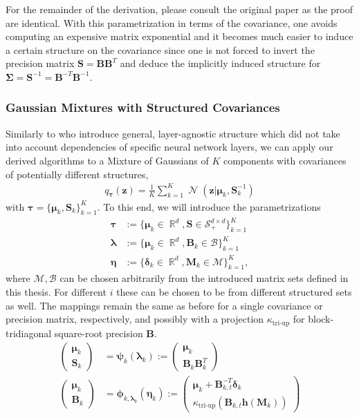 \documentclass[a4paper, 11pt, oneside]{scrartcl}
\theoremstyle{break}
\DeclareMathOperator{\Normal}{\mathcal{N}}
\DeclareMathOperator{\Real}{\mathbb{R}}
\newcommand{\matr}[1]{\boldsymbol{#1}}
\newcommand{\set}[1]{\mathcal{#1}}
\numberwithin{equation}{section}
\begin{document}
				For the remainder of the derivation, please consult the original paper \parencite{LNK+21} as the proof are identical.
				With this parametrization in terms of the covariance, one avoids computing an expensive matrix exponential and it becomes much easier to induce a certain structure on the covariance since one is not forced to invert the precision matrix $\matr{S} = \matr{B} \matr{B}^T$ and deduce the implicitly induced structure for $\matr{\Sigma} = \matr{S}^{-1} = \matr{B}^{-T} \matr{B}^{-1}$.

			\subsubsection{Gaussian Mixtures with Structured Covariances}
				Similarly to \parencite{LNK+21} who introduce general, layer-agnostic structure which did not take into account dependencies of specific neural network layers, we can apply our derived algorithms to a Mixture of Gaussians of $K$ components with covariances of potentially different structures,
				\begin{align*}
					q_{\matr{\tau}} (\matr{z}) = \frac{1}{K} \sum_{k=1}^K \Normal (\matr{z} | \matr{\mu}_k, \matr{S}_k^{-1})
				\end{align*}
				with $\matr{\tau} = \{\matr{\mu}_k, \matr{S}_k\}_{k=1}^K$.
				To this end, we will introduce the parametrizations
				\begin{align*}
					\matr{\tau} &:= \{\matr{\mu}_k \in \Real^d, \matr{S} \in \set{S}_+^{d \times d}\}_{k=1}^K \\
					\matr{\lambda} &:= \{\matr{\mu}_k \in \Real^d, \matr{B}_k \in \set{B} \}_{k=1}^K \\
					\matr{\eta} &:= \{\matr{\delta}_k \in \Real^d, \matr{M}_k \in \set{M} \}_{k=1}^K,
				\end{align*}
				where $\set{M}, \set{B}$ can be chosen arbitrarily from the introduced matrix sets defined in this thesis. 
				For different $i$ these can be chosen to be from different structured sets as well. 
				The mappings remain the same as before for a single covariance or precision matrix, respectively, and possibly with a projection $\kappa_{\text{tri-up}}$ for block-tridiagonal square-root precision $\matr{B}$.
				\begin{align*}
					\begin{pmatrix} \matr{\mu}_k \\ \matr{S}_k \end{pmatrix} &= \matr{\psi}_k(\matr{\lambda}_k) := \begin{pmatrix} \matr{\mu}_k \\ \matr{B}_k \matr{B}_k^T \end{pmatrix} \\
					\begin{pmatrix} \matr{\mu}_k \\ \matr{B}_k \end{pmatrix} &= \matr{\phi}_{k, \matr{\lambda}_k} (\matr{\eta}_k) := \begin{pmatrix} \matr{\mu}_k + \matr{B}_{k, t}^{-T} \matr{\delta}_k \\ \kappa_{\text{tri-up}} (\matr{B}_{k, t} \matr{h} (\matr{M}_k)) \end{pmatrix}
				\end{align*}
\end{document}
